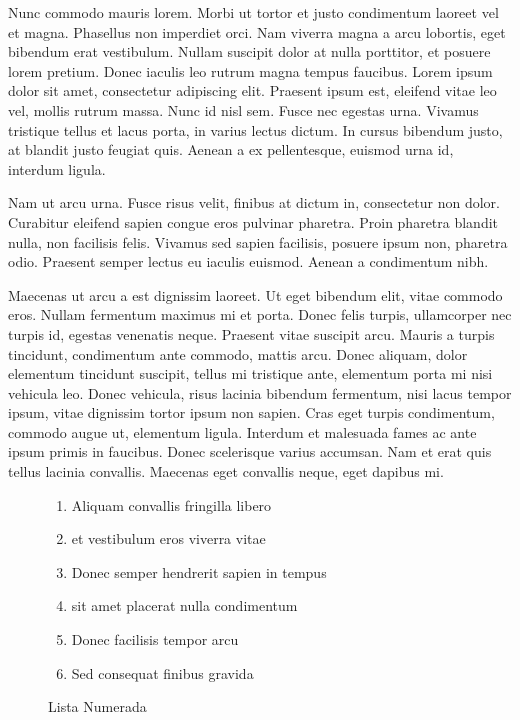 Nunc commodo mauris lorem. Morbi ut tortor et justo condimentum laoreet vel et magna. Phasellus non imperdiet orci. Nam viverra magna a arcu lobortis, eget bibendum erat vestibulum. Nullam suscipit dolor at nulla porttitor, et posuere lorem pretium. Donec iaculis leo rutrum magna tempus faucibus. Lorem ipsum dolor sit amet, consectetur adipiscing elit. Praesent ipsum est, eleifend vitae leo vel, mollis rutrum massa. Nunc id nisl sem. Fusce nec egestas urna. Vivamus tristique tellus et lacus porta, in varius lectus dictum. In cursus bibendum justo, at blandit justo feugiat quis. Aenean a ex pellentesque, euismod urna id, interdum ligula.

Nam ut arcu urna. Fusce risus velit, finibus at dictum in, consectetur non dolor. Curabitur eleifend sapien congue eros pulvinar pharetra. Proin pharetra blandit nulla, non facilisis felis. Vivamus sed sapien facilisis, posuere ipsum non, pharetra odio. Praesent semper lectus eu iaculis euismod. Aenean a condimentum nibh.

Maecenas ut arcu a est dignissim laoreet. Ut eget bibendum elit, vitae commodo eros. Nullam fermentum maximus mi et porta. Donec felis turpis, ullamcorper nec turpis id, egestas venenatis neque. Praesent vitae suscipit arcu. Mauris a turpis tincidunt, condimentum ante commodo, mattis arcu. Donec aliquam, dolor elementum tincidunt suscipit, tellus mi tristique ante, elementum porta mi nisi vehicula leo. Donec vehicula, risus lacinia bibendum fermentum, nisi lacus tempor ipsum, vitae dignissim tortor ipsum non sapien. Cras eget turpis condimentum, commodo augue ut, elementum ligula. Interdum et malesuada fames ac ante ipsum primis in faucibus. Donec scelerisque varius accumsan. Nam et erat quis tellus lacinia convallis. Maecenas eget convallis neque, eget dapibus mi.

\begin{figure}[h]
\begin{enumerate}
\item Aliquam convallis fringilla libero
\item et vestibulum eros viverra vitae
\item Donec semper hendrerit sapien in tempus
\item sit amet placerat nulla condimentum
\item Donec facilisis tempor arcu
\item Sed consequat finibus gravida
\end{enumerate}
\caption{Lista Numerada}
\end{figure}

